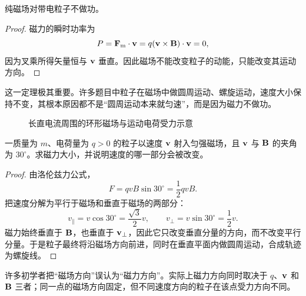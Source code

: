 \begin{theorem}
纯磁场对带电粒子不做功。
\end{theorem}

\begin{proof}
磁力的瞬时功率为
\[
  P=\vb{F}_\mathrm{m}\cdot\vb{v}=q(\vb{v}\times\vb{B})\cdot\vb{v}=0,
\]
因为叉乘所得矢量恒与 $\vb{v}$ 垂直。因此磁场不能改变粒子的动能，只能改变其运动方向。
\end{proof}

这一定理极其重要。许多题目中粒子在磁场中做圆周运动、螺旋运动，速度大小保持不变，其根本原因都不是“圆周运动本来就匀速”，而是因为磁力不做功。

\begin{figure}[H]
\centering
{}
\caption{长直电流周围的环形磁场与运动电荷受力示意}
\end{figure}

\begin{example}
一质量为 $m$、电荷量为 $q>0$ 的粒子以速度 $\vb{v}$ 射入匀强磁场，且 $\vb{v}$ 与 $\vb{B}$ 的夹角为 $30^\circ$。求磁力大小，并说明速度的哪一部分会被改变。
\end{example}

\begin{proof}
由洛伦兹力公式，
\[
  F= qvB\sin 30^\circ=\frac{1}{2}qvB.
\]
把速度分解为平行于磁场和垂直于磁场的两部分：
\[
  v_\parallel=v\cos30^\circ=\frac{\sqrt{3}}{2}v,
  \qquad
  v_\perp=v\sin30^\circ=\frac{1}{2}v.
\]
磁力始终垂直于 $\vb{B}$，也垂直于 $\vb{v}_\perp$，因此它只改变垂直分量的方向，而不改变平行分量。于是粒子最终将沿磁场方向前进，同时在垂直平面内做圆周运动，合成轨迹为螺旋线。
\end{proof}

\begin{remark}
许多初学者把“磁场方向”误认为“磁力方向”。实际上磁力方向同时取决于 $q$、$\vb{v}$ 和 $\vb{B}$ 三者；同一点的磁场方向固定，但不同速度方向的粒子在该点受力方向不同。
\end{remark}

